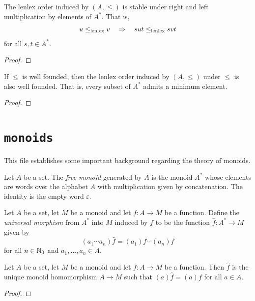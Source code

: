 \begin{lemma}%
	\label{lem:lt_sizelexi_stable}
	\rocqok{}
	The lenlex order induced by $(A, \leq)$ is stable under right and left multiplication by elements of $A^\ast$. That is,
	\[u\leq_\textrm{lenlex} v \quad \Rightarrow \quad sut \leq_\textrm{lenlex} svt \]
	for all $s, t\in A^\ast$.
\end{lemma}
\begin{proof}
	\rocqok{}
\end{proof}

\begin{lemma}%
	\label{lem:sizelexi_wf}
	\rocqok{}
	If $\leq$ is well founded, then the lenlex order induced by $(A, \leq)$ under $\leq$ is also well founded. That is,
	every subset of $A^\ast$ admits a minimum element.
\end{lemma}
\begin{proof}
	\rocqok{}
\end{proof}

\section{\texttt{monoids}}

This file establishes some important background regarding the theory of monoids.

\begin{definition}%
	\label{def:FreeMonoidT}
	\rocqok{}
	Let $A$ be a set. The \emph{free monoid} generated by $A$ is the monoid $A^\ast$ whose elements are words over the
	alphabet $A$ with multiplication given by concatenation. The identity is the empty word $\varepsilon$.
\end{definition}

\begin{definition}%
	\label{def:univmor}
	\rocqok{}
	Let $A$ be a set, let $M$ be a monoid and let $f: A \rightarrow M$ be a function.
	Define the \emph{universal morphism} from $A^\ast$ into $M$ induced by $f$ to be the function
	$\hat{f}: A^\ast \rightarrow M$ given by
	\[(a_1\cdots a_n)\hat{f} = (a_1)f\cdots(a_n)f\]
	for all $n\in \mathbb{N}_0$ and $a_1, \ldots, a_n\in A$.
\end{definition}

\begin{lemma}%
	\label{lem:univmor_uniq}
	\rocqok{}
	Let $A$ be a set, let $M$ be a monoid and let $f: A \rightarrow M$ be a function.
	Then $\hat{f}$ is the unique monoid homomorphism $A \rightarrow M$ such that $(a)\hat{f} = (a)f$ for all $a\in A$.
\end{lemma}
\begin{proof}
	\rocqok{}
\end{proof}


